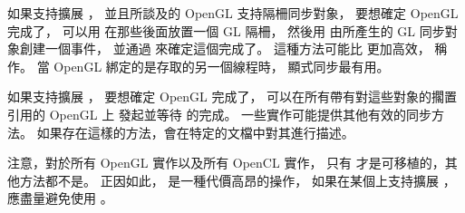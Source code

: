 如果支持擴展 ，
並且所談及的 OpenGL 支持隔柵同步對象，
要想確定 OpenGL 完成了，
可以用  在那些後面放置一個 GL 隔柵，
然後用  由所產生的 GL 同步對象創建一個事件，
並通過  來確定這個完成了。
這種方法可能比  更加高效，
稱作{}。
當 OpenGL 綁定的是存取的另一個線程時，
顯式同步最有用。

如果支持擴展 ，
要想確定 OpenGL 完成了，
可以在所有帶有對這些對象的擱置引用的 OpenGL 上
發起並等待  的完成。
一些實作可能提供其他有效的同步方法。
如果存在這樣的方法，會在特定的文檔中對其進行描述。

注意，對於所有 OpenGL 實作以及所有 OpenCL 實作，
只有  才是可移植的，其他方法都不是。
正因如此，  是一種代價高昂的操作，
如果在某個上支持擴展 ，
應盡量避免使用 。
\stopreplacepar

